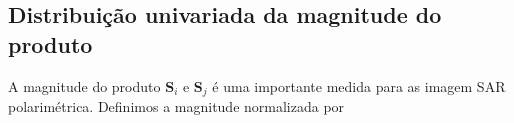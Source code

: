 \subsection{Distribuição univariada da magnitude do produto}
A magnitude do produto $\mathbf{S}_i$ e $\mathbf{S}_j$ é uma importante medida para as imagem SAR polarimétrica. Definimos a magnitude normalizada por 

